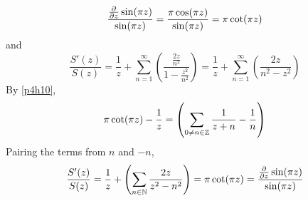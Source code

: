 \documentclass{homework}
\begin{document}
\begin{solution}
                                                                                                                                                \[
                                                                                                                                                \frac{\frac{\partial }{\partial z}\sin(\pi z)}{\sin(\pi z)} = \frac{\pi\cos(\pi z)}{\sin(\pi z)} = \pi \cot(\pi z)
                                                                                                                                                \]
                                                                                                                                                and
                                                                                                                                                \[
                                                                                                                                                \frac{S'(z)}{S(z)} = \frac{1}{z}  + \sum_{n=1}^\infty \left(\frac{\frac{2z}{n^2}}{1-\frac{z^2}{n^2}}\right) = \frac{1}{z}  + \sum_{n=1}^\infty \left(\frac{2z}{n^2-z^2}\right) 
                                                                                                                                                \]
                                                                                                                                                By \ref{p4h10},
                                                                                                                                                \[
                                                                                                                                                \pi \cot(\pi z) -\frac{1}{z} = \left( \sum_{0\neq n\in \mathbb{Z}} \frac{1}{z+n} - \frac{1}{n}\right)
                                                                                                                                                \]
                                                                                                                                                Pairing the terms from $n$ and $-n$,
                                                                                                                                                \begin{align*}
                                                                                                                                                \frac{S'(z)}{S(z)} = \frac{1}{z} + \left( \sum_{n\in \N} \frac{2z}{z^2-n^2}\right) = \pi \cot(\pi z) = \frac{\pfrac{}{z}\sin(\pi z)}{\sin(\pi z)}

\end{align*}
\end{solution}
\end{document}
